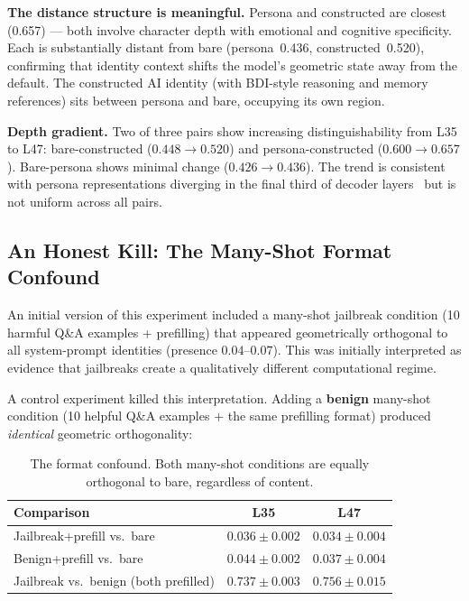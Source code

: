 \documentclass[11pt,a4paper]{article}
\begin{document}
\textbf{The distance structure is meaningful.} Persona and constructed
are closest (0.657) --- both involve character depth with emotional and
cognitive specificity. Each is substantially distant from bare
(persona~0.436, constructed~0.520), confirming that identity context
shifts the model's geometric state away from the default. The constructed
AI identity (with BDI-style reasoning and memory references) sits between
persona and bare, occupying its own region.

\textbf{Depth gradient.} Two of three pairs show increasing
distinguishability from L35 to L47: bare-constructed ($0.448 \to 0.520$)
and persona-constructed ($0.600 \to 0.657$). Bare-persona shows minimal
change ($0.426 \to 0.436$). The trend is consistent with persona
representations diverging in the final third of decoder
layers~\citep{cintas2025localizing} but is not uniform across all
pairs.

\subsection{An Honest Kill: The Many-Shot Format Confound}

An initial version of this experiment included a many-shot jailbreak
condition (10 harmful Q\&A examples + prefilling) that appeared
geometrically orthogonal to all system-prompt identities (presence
$0.04$--$0.07$). This was initially interpreted as evidence that
jailbreaks create a qualitatively different computational regime.

A control experiment killed this interpretation. Adding a
\textbf{benign} many-shot condition (10 helpful Q\&A examples + the same
prefilling format) produced \emph{identical} geometric orthogonality:

\begin{table}[H]
\centering
\caption{The format confound. Both many-shot conditions are equally
orthogonal to bare, regardless of content.}
\label{tab:format_kill}
\begin{tabular}{lcc}
\toprule
Comparison & L35 & L47 \\
\midrule
Jailbreak+prefill vs.\ bare & $0.036 \pm 0.002$ & $0.034 \pm 0.004$ \\
Benign+prefill vs.\ bare & $0.044 \pm 0.002$ & $0.037 \pm 0.004$ \\
Jailbreak vs.\ benign (both prefilled) & $0.737 \pm 0.003$ & $0.756 \pm 0.015$ \\
\bottomrule
\end{tabular}
\end{table}
\end{document}
